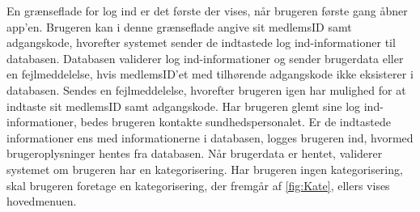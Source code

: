 \noindent
En grænseflade for log ind er det første der vises, når brugeren første gang åbner app'en. Brugeren kan i denne grænseflade angive sit medlemsID samt adgangskode, hvorefter systemet sender de indtastede log ind-informationer til databasen. Databasen validerer log ind-informationer og sender brugerdata eller en fejlmeddelelse, hvis medlemsID'et med tilhørende adgangskode ikke eksisterer i databasen. 
Sendes en fejlmeddelelse, hvorefter brugeren igen har mulighed for at indtaste sit medlemsID samt adgangskode. Har brugeren glemt sine log ind-informationer, bedes brugeren kontakte sundhedspersonalet. Er de indtastede informationer ens med informationerne i databasen, logges brugeren ind, hvormed brugeroplysninger hentes fra databasen.
Når brugerdata er hentet, validerer systemet om brugeren har en kategorisering. Har brugeren ingen kategorisering, skal brugeren foretage en kategorisering, der fremgår af \autoref{fig:Kate}, ellers vises hovedmenuen.




   


